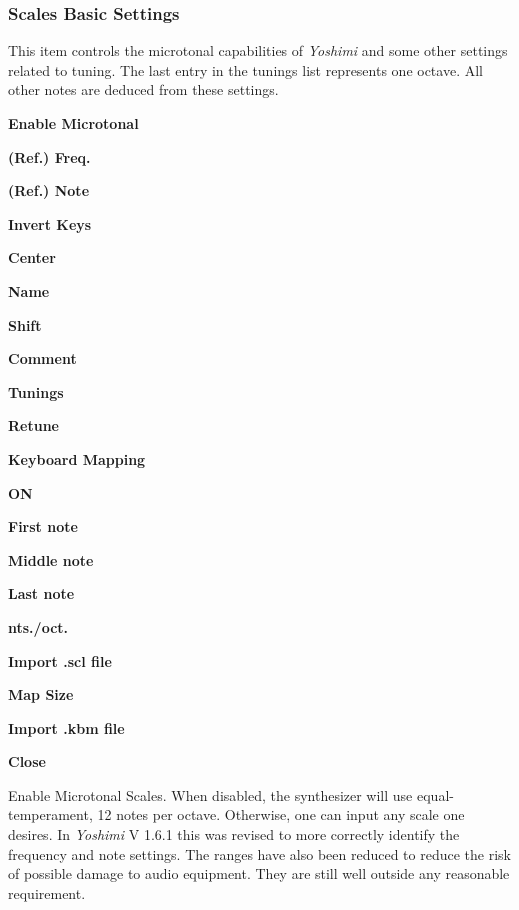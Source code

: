 \subsubsection{Scales Basic Settings}
\label{subsubsec:scales_basic_settings}

   This item controls the microtonal capabilities of \textsl{Yoshimi} and
   some other settings related to tuning.
   The last entry in the tunings list represents one octave.
   All other notes are deduced from these settings.

   \begin{enumber}
      \item \textbf{Enable Microtonal}
      \item \textbf{(Ref.) Freq.}
      \item \textbf{(Ref.) Note}
      \item \textbf{Invert Keys}
      \item \textbf{Center}
      \item \textbf{Name}
      \item \textbf{Shift}
      \item \textbf{Comment}
      \item \textbf{Tunings}
      \item \textbf{Retune}
      \item \textbf{Keyboard Mapping}
      \item \textbf{ON}
      \item \textbf{First note}
      \item \textbf{Middle note}
      \item \textbf{Last note}
      \item \textbf{nts./oct.}
      \item \textbf{Import .scl file}
      \item \textbf{Map Size}
      \item \textbf{Import .kbm file}
      \item \textbf{Close}
   \end{enumber}

   \setcounter{ItemCounter}{0}      %

   Enable Microtonal Scales.
   When disabled, the synthesizer will use equal-temperament, 12 notes per
   octave.  Otherwise, one can input any scale one desires.
   In \textsl{Yoshimi} V 1.6.1 this was revised to more correctly identify
   the frequency and note settings. The ranges have also been reduced to
   reduce the risk of possible damage to audio equipment. They are still
   well outside any reasonable requirement.

